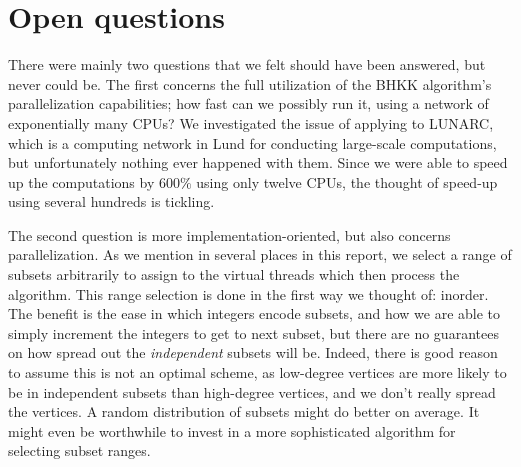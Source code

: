 \documentclass{cslthse-msc}
\begin{document}
\section{Open questions}
There were mainly two questions that we felt should have been answered, but never could be. The first concerns the full utilization of the BHKK algorithm's parallelization capabilities; how fast can we possibly run it, using a network of exponentially many CPUs? We investigated the issue of applying to LUNARC, which is a computing network in Lund for conducting large-scale computations, but unfortunately nothing ever happened with them. Since we were able to speed up the computations by $600\%$ using only twelve CPUs, the thought of speed-up using several hundreds is tickling.

The second question is more implementation-oriented, but also concerns parallelization. As we mention in several places in this report, we select a range of subsets arbitrarily to assign to the virtual threads which then process the algorithm. This range selection is done in the first way we thought of: inorder. The benefit is the ease in which integers encode subsets, and how we are able to simply increment the integers to get to next subset, but there are no guarantees on how spread out the \emph{independent} subsets will be. Indeed, there is good reason to assume this is not an optimal scheme, as low-degree vertices are more likely to be in independent subsets than high-degree vertices, and we don't really spread the vertices. A random distribution of subsets might do better on average. It might even be worthwhile to invest in a more sophisticated algorithm for selecting subset ranges.

\end{document}
